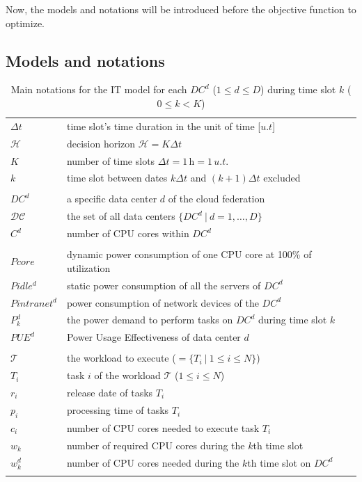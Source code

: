 Now, the models and notations will be introduced before the objective function to optimize.

\subsection{Models and notations}
\label{sec:modelsnotations_ccgrid}

\begin{table}[!t]
\caption{Main notations for the IT model for each $DC^d$ ($1\leq d\leq D$) during time slot $k$ ($0\leq k< K$)\label{table:variablesIT}}
\begin{center}
\begin{tabular}{l p{6cm}}


$\Delta t$ & time slot's time duration in the unit of time [$u.t$] \\
$\mathcal{H}$ & decision horizon $\mathcal{H} = K\Delta t$ \\
$K$ & number of time slots $\Delta t = 1\,\text{h} = 1\,u.t.$ \\ 
$k$ & time slot between dates $k\Delta t$ and $(k+1)\Delta t$ excluded \\ \\
$DC^d$ & a specific data center $d$ of the cloud federation \\
$\mathcal{DC}$ & the set of all data centers $\{DC^d \ | \ d=1, \ldots, D\}$ \\
$C^d$ & number of CPU cores within $DC^d$ \\
\\
$Pcore$ & dynamic power consumption of one CPU core at 100\% of utilization \\
$Pidle^d$ & static power consumption of all the servers of $DC^d$ \\
$Pintranet^d$ & power consumption of network devices of the $DC^d$  \\
$P_k^d$ & the power demand to perform tasks on $DC^d$ during time slot $k$ \\ 
$PUE^d$ & Power Usage Effectiveness of data center $d$\\ 
\\
$\mathcal{T}$ & the workload to execute ($ = \{ T_i\ |\ 1\leq i\leq N\}$) \\
$T_i$ & task $i$ of the workload $\mathcal{T}$ ($1\leq i\leq N$) \\
$r_i$ & release date of tasks $T_i$\\
$p_i$ & processing time of tasks $T_i$\\
$c_i$ & number of CPU cores needed to execute task $T_i$\\ 
$w_k$ & number of required CPU cores during the $k$th time slot \\
$w_k^d$ & number of CPU cores needed during the $k$th time slot on $DC^d$\\ \\\end{tabular}
\end{center}
\end{table}


